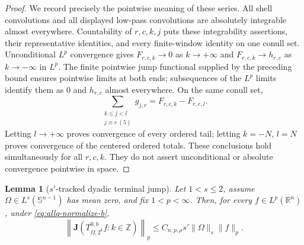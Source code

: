\documentclass[11pt]{article}
\numberwithin{equation}{section}
\newtheorem{lemma}[theorem]{Lemma}
\theoremstyle{remark}
\theoremstyle{definition}
\newcommand{\R}{\mathbb R}
\newcommand{\Sph}{\mathbb S}
\begin{document}
\begin{proof}
We record precisely the pointwise meaning of these series.  All shell
convolutions and all displayed low-pass convolutions are absolutely
integrable almost everywhere.  Countability of $r,c,k,j$ puts these
integrability assertions, their representative identities, and every
finite-window identity on one conull set.  Unconditional $L^p$
convergence gives $F_{r,c,k}\to0$ as $k\to+\infty$ and
$F_{r,c,k}\to h_{r,c}$ as $k\to-\infty$ in $L^p$.
The finite pointwise jump functional supplied by the preceding bound
ensures pointwise limits at both ends; subsequences of the $L^p$
limits identify them as $0$ and $h_{r,c}$ almost everywhere.
On the same conull set,
\[
 \sum_{\substack{k\le j<l\\j\equiv c\ (5)}}g_{j,r}
       =F_{r,c,k}-F_{r,c,l}.
\]
Letting $l\to+\infty$ proves convergence of every ordered tail;
letting $k=-N$, $l=N$ proves convergence of the centered ordered totals.
These conclusions hold simultaneously for all $r,c,k$.  They do not
assert unconditional or absolute convergence pointwise in space.
\end{proof}

\begin{lemma}[$s'$-tracked dyadic terminal jump]
\label{lem:allq-terminal-dyadic}
Let $1<s\le2$, assume $\Omega\in L^s(\Sph^{n-1})$ has mean zero, and fix
$1<p<\infty$.  Then, for every $f\in L^p(\R^n)$, under
\eqref{eq:allq-normalize-b},
\begin{equation}\label{eq:allq-terminal-dyadic}
 \left\|\mathbf J(T^{0,b}_{\Omega,2^k}f:k\in\mathbb Z)\right\|_p
 \le C_{n,p,\rho}s'\|\Omega\|_s\|f\|_p.
\end{equation}
\end{lemma}
\end{document}
